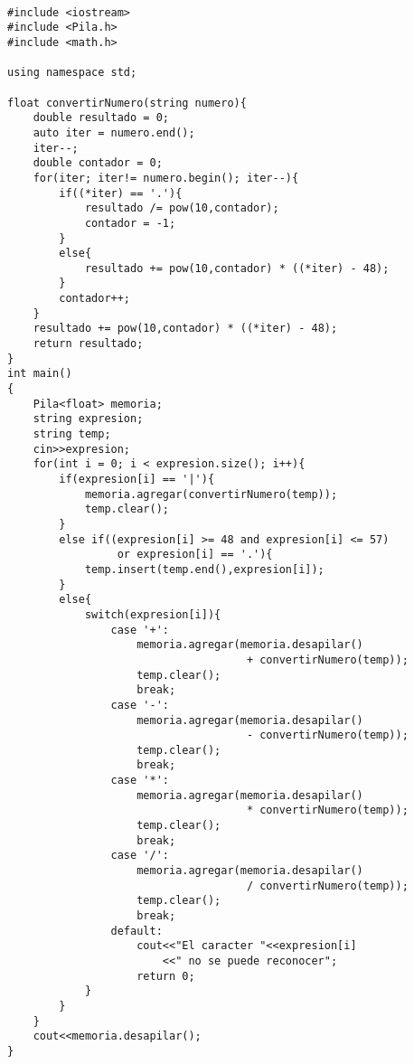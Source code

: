 \documentclass[a4paper,12pt]{article}
\begin{document}
\begin{lstlisting}

#include <iostream>
#include <Pila.h>
#include <math.h>

using namespace std;

float convertirNumero(string numero){
    double resultado = 0;
    auto iter = numero.end();
    iter--;
    double contador = 0;
    for(iter; iter!= numero.begin(); iter--){
        if((*iter) == '.'){
            resultado /= pow(10,contador);
            contador = -1;
        }
        else{
            resultado += pow(10,contador) * ((*iter) - 48);
        }
        contador++;
    }
    resultado += pow(10,contador) * ((*iter) - 48);
    return resultado;
}
int main()
{
    Pila<float> memoria;
    string expresion;
    string temp;
    cin>>expresion;
    for(int i = 0; i < expresion.size(); i++){
        if(expresion[i] == '|'){
            memoria.agregar(convertirNumero(temp));
            temp.clear();
        }
        else if((expresion[i] >= 48 and expresion[i] <= 57)
                 or expresion[i] == '.'){
            temp.insert(temp.end(),expresion[i]);
        }
        else{
            switch(expresion[i]){
                case '+':
                    memoria.agregar(memoria.desapilar()
                                     + convertirNumero(temp));
                    temp.clear();
                    break;
                case '-':
                    memoria.agregar(memoria.desapilar()
                                     - convertirNumero(temp));
                    temp.clear();
                    break;
                case '*':
                    memoria.agregar(memoria.desapilar()
                                     * convertirNumero(temp));
                    temp.clear();
                    break;
                case '/':
                    memoria.agregar(memoria.desapilar()
                                     / convertirNumero(temp));
                    temp.clear();
                    break;
                default:
                    cout<<"El caracter "<<expresion[i]
                        <<" no se puede reconocer";
                    return 0;
            }
        }
    }
    cout<<memoria.desapilar();
}



\end{lstlisting}
\end{document}
